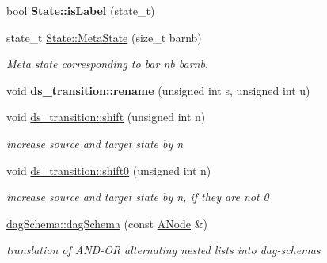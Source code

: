 \begin{DoxyCompactItemize}
\mbox{\label{group__schemata_gabd744185c22c686d1c95d74523a007b3}} 
bool {\bfseries State\+::is\+Label} (state\+\_\+t)
\item 
\mbox{\label{group__schemata_ga0ffeaad4a7482bc302dce44a23a85a6e}} 
state\+\_\+t \mbox{\hyperlink{group__schemata_ga0ffeaad4a7482bc302dce44a23a85a6e}{State\+::\+Meta\+State}} (size\+\_\+t barnb)
\begin{DoxyCompactList}\small\item\em Meta state corresponding to bar nb barnb. \end{DoxyCompactList}\item 
\mbox{\label{group__schemata_ga99612639925cfc0a63a173ea167a6d3b}} 
void {\bfseries ds\+\_\+transition\+::rename} (unsigned int s, unsigned int u)
\item 
\mbox{\label{group__schemata_gaa6bf3664ce3ec4ceddc6fc0546e7af84}} 
void \mbox{\hyperlink{group__schemata_gaa6bf3664ce3ec4ceddc6fc0546e7af84}{ds\+\_\+transition\+::shift}} (unsigned int n)
\begin{DoxyCompactList}\small\item\em increase source and target state by n \end{DoxyCompactList}\item 
\mbox{\label{group__schemata_ga811afd94c0a2afda729115e1afade496}} 
void \mbox{\hyperlink{group__schemata_ga811afd94c0a2afda729115e1afade496}{ds\+\_\+transition\+::shift0}} (unsigned int n)
\begin{DoxyCompactList}\small\item\em increase source and target state by n, if they are not 0 \end{DoxyCompactList}\item 
\mbox{\label{group__schemata_ga1762a1cf61c23100f58a69f092f94e27}} 
\mbox{\hyperlink{group__schemata_ga1762a1cf61c23100f58a69f092f94e27}{dag\+Schema\+::dag\+Schema}} (const \mbox{\hyperlink{classANode}{A\+Node}} \&)
\begin{DoxyCompactList}\small\item\em translation of A\+N\+D-\/\+OR alternating nested lists into dag-\/schemas \end{DoxyCompactList}\item 

\end{DoxyCompactItemize}
